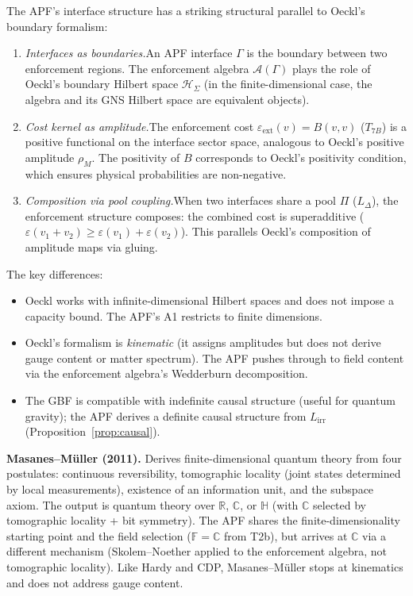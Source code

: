 \documentclass[11pt,a4paper]{article}
\theoremstyle{definition}
\begin{document}
The APF's interface structure has a striking structural parallel to
Oeckl's boundary formalism:
\begin{enumerate}[label=(\alph*),nosep]
  \item \textit{Interfaces as boundaries.}\quad An APF interface
  $\Gamma$ is the boundary between two enforcement regions.  The
  enforcement algebra $\mathcal{A}(\Gamma)$ plays the role of
  Oeckl's boundary Hilbert space $\mathcal{H}_\Sigma$ (in the
  finite-dimensional case, the algebra and its GNS Hilbert space
  are equivalent objects).
  \item \textit{Cost kernel as amplitude.}\quad The enforcement cost
  $\varepsilon_{\mathrm{ext}}(v) = B(v,v)$ ($T_{7B}$) is a positive
  functional on the interface sector space, analogous to Oeckl's
  positive amplitude $\rho_M$.  The positivity of $B$ corresponds to
  Oeckl's positivity condition, which ensures physical probabilities
  are non-negative.
  \item \textit{Composition via pool coupling.}\quad When two
  interfaces share a pool $\Pi$ ($L_\Delta$), the enforcement
  structure composes: the combined cost is superadditive
  ($\varepsilon(v_1 + v_2) \ge \varepsilon(v_1) + \varepsilon(v_2)$).
  This parallels Oeckl's composition of amplitude maps via gluing.
\end{enumerate}
The key differences:
\begin{itemize}[nosep]
  \item Oeckl works with infinite-dimensional Hilbert spaces and
  does not impose a capacity bound.  The APF's A1 restricts to finite
  dimensions.
  \item Oeckl's formalism is \emph{kinematic} (it assigns amplitudes
  but does not derive gauge content or matter spectrum).  The APF
  pushes through to field content via the enforcement algebra's
  Wedderburn decomposition.
  \item The GBF is compatible with indefinite causal structure
  (useful for quantum gravity); the APF derives a definite causal
  structure from $L_{\mathrm{irr}}$
  (Proposition~\ref{prop:causal}).
\end{itemize}

\smallskip\noindent\textbf{Masanes--M\"uller (2011).}\quad
Derives finite-dimensional quantum theory from four postulates:
continuous reversibility, tomographic locality (joint states
determined by local measurements), existence of an information unit,
and the subspace axiom.  The output is quantum theory over
$\mathbb{R}$, $\mathbb{C}$, or $\mathbb{H}$ (with $\mathbb{C}$
selected by tomographic locality + bit symmetry).  The APF shares
the finite-dimensionality starting point and the field selection
($\mathbb{F} = \mathbb{C}$ from T2b), but arrives at $\mathbb{C}$
via a different mechanism (Skolem--Noether applied to the enforcement
algebra, not tomographic locality).  Like Hardy and CDP,
Masanes--M\"uller stops at kinematics and does not address gauge
content.
\end{document}

